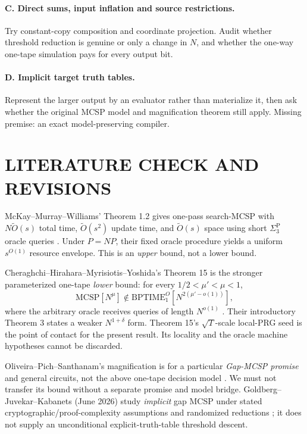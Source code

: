 \documentclass[11pt]{article}
\begin{document}
\paragraph{C. Direct sums, input inflation and source restrictions.}
Try constant-copy composition and coordinate projection.  Audit whether
threshold reduction is genuine or only a change in \(N\), and whether
the one-way one-tape simulation pays for every output bit.

\paragraph{D. Implicit target truth tables.}
Represent the larger output by an evaluator rather than materialize it,
then ask whether the original MCSP model and magnification theorem still
apply.  Missing premise: an exact model-preserving compiler.

\section{LITERATURE CHECK AND REVISIONS}
McKay--Murray--Williams' Theorem 1.2 gives one-pass
search-MCSP with \(N\widetilde O(s)\) total time,
\(\widetilde O(s^2)\) update time, and \(\widetilde O(s)\)
space using short \(\Sigma_3^{\mathrm P}\) oracle queries
\cite{MMW2019}.  Under \(P=NP\), their fixed oracle procedure
yields a uniform \(s^{O(1)}\) resource envelope.
This is an \emph{upper} bound, not a lower bound.

Cheraghchi--Hirahara--Myrisiotis--Yoshida's
Theorem 15 is the stronger parameterized one-tape
\emph{lower} bound: for every \(1/2<\mu'<\mu<1\),
\[
  \mathrm{MCSP}[N^\mu]\notin
  \mathrm{BPTIME}_1^{O}
     [N^{2(\mu'-o(1))}],
\]
where the arbitrary oracle receives queries of length
\(N^{o(1)}\) \cite{CHMY2020}.
Their introductory Theorem 3 states a weaker \(N^{1+\delta}\)
form.  Theorem 15's \(\sqrt{T}\)-scale local-PRG seed
is the point of contact for the present result.
Its locality and the oracle machine hypotheses cannot be discarded.

Oliveira--Pich--Santhanam's magnification is for a
particular \emph{Gap-MCSP promise} and general circuits, not the
above one-tape decision model \cite{OPS2018}.  We must not
transfer its bound without a separate promise and model bridge.
Goldberg--Juvekar--Kabanets (June 2026) study
\emph{implicit} gap MCSP under stated cryptographic/proof-complexity
assumptions and randomized reductions \cite{GJK2026}; it does not
supply an unconditional explicit-truth-table threshold descent.
\end{document}

